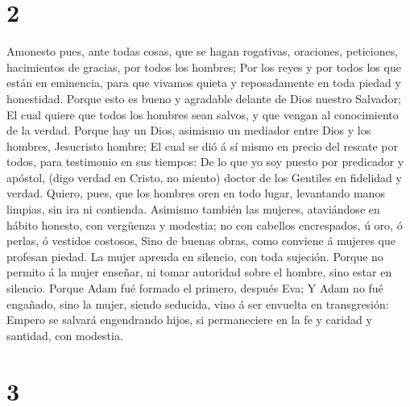 \hypertarget{section-1}{%
\section{2}\label{section-1}}

 Amonesto pues, ante todas cosas, que se hagan rogativas,
oraciones, peticiones, hacimientos de gracias, por todos los hombres;
 Por los reyes y por todos los que están en eminencia, para
que vivamos quieta y reposadamente en toda piedad y honestidad.
 Porque esto es bueno y agradable delante de Dios nuestro
Salvador;  El cual quiere que todos los hombres sean salvos,
y que vengan al conocimiento de la verdad.  Porque hay un
Dios, asimismo un mediador entre Dios y los hombres, Jesucristo hombre;
 El cual se dió á sí mismo en precio del rescate por todos,
para testimonio en sus tiempos:  De lo que yo soy puesto por
predicador y apóstol, (digo verdad en Cristo, no miento) doctor de los
Gentiles en fidelidad y verdad.  Quiero, pues, que los
hombres oren en todo lugar, levantando manos limpias, sin ira ni
contienda.  Asimismo también las mujeres, ataviándose en
hábito honesto, con vergüenza y modestia; no con cabellos encrespados, ú
oro, ó perlas, ó vestidos costosos,  Sino de buenas obras,
como conviene á mujeres que profesan piedad.  La mujer
aprenda en silencio, con toda sujeción.  Porque no permito
á la mujer enseñar, ni tomar autoridad sobre el hombre, sino estar en
silencio.  Porque Adam fué formado el primero, después Eva;
 Y Adam no fué engañado, sino la mujer, siendo seducida,
vino á ser envuelta en transgresión:  Empero se salvará
engendrando hijos, si permaneciere en la fe y caridad y santidad, con
modestia.

\hypertarget{section-2}{%
\section{3}\label{section-2}}

